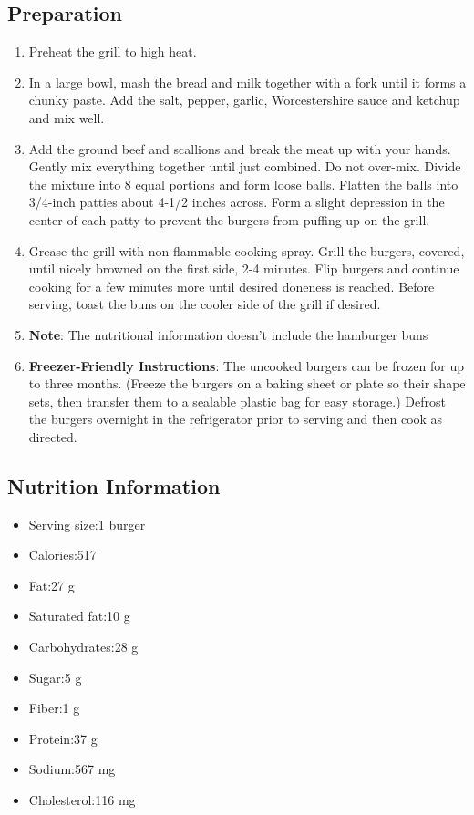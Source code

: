 \subsection{Preparation}
\begin{enumerate}
    \item Preheat the grill to high heat.
    \item In a large bowl, mash the bread and milk together with a fork until it forms a chunky paste. Add the salt, pepper, garlic, Worcestershire sauce and ketchup and mix well.
    \item Add the ground beef and scallions and break the meat up with your hands. Gently mix everything together until just combined. Do not over-mix. Divide the mixture into 8 equal portions and form loose balls. Flatten the balls into 3/4-inch patties about 4-1/2 inches across. Form a slight depression in the center of each patty to prevent the burgers from puffing up on the grill.
    \item Grease the grill with non-flammable cooking spray. Grill the burgers, covered, until nicely browned on the first side, 2-4 minutes. Flip burgers and continue cooking for a few minutes more until desired doneness is reached. Before serving, toast the buns on the cooler side of the grill if desired.
    \item \textbf{Note}: The nutritional information doesn't include the hamburger buns
    \item \textbf{Freezer-Friendly Instructions}: The uncooked burgers can be frozen for up to three months. (Freeze the burgers on a baking sheet or plate so their shape sets, then transfer them to a sealable plastic bag for easy storage.) Defrost the burgers overnight in the refrigerator prior to serving and then cook as directed.
\end{enumerate}

\subsection{Nutrition Information}
\begin{itemize}
    \item Serving size:1 burger
    \item Calories:517
    \item Fat:27 g
    \item Saturated fat:10 g
    \item Carbohydrates:28 g
    \item Sugar:5 g
    \item Fiber:1 g
    \item Protein:37 g
    \item Sodium:567 mg
    \item Cholesterol:116 mg
\end{itemize}
